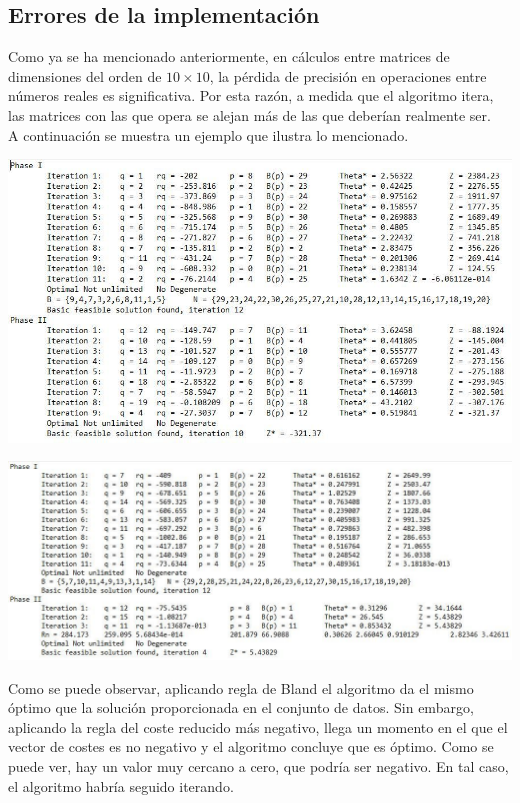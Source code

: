 \documentclass[12pt, titlepage]{article}
\begin{document}
\subsection{Errores de la implementación}
Como ya se ha mencionado anteriormente, en cálculos entre matrices de dimensiones del orden de $10 \times 10$, la pérdida de precisión en operaciones entre números reales es significativa. Por esta razón, a medida que el algoritmo itera, las matrices con las que opera se alejan más de las que deberían realmente ser. \\
A continuación se muestra un ejemplo que ilustra lo mencionado.\\
\begin{center}
\includegraphics[scale=0.5]{imagenes/output_1_RB.JPG}
\end{center}

\begin{center}
\includegraphics[scale=0.45]{imagenes/output_1_NRB.JPG}
\end{center}
Como se puede observar, aplicando regla de Bland el algoritmo da el mismo óptimo que la solución proporcionada en el conjunto de datos. Sin embargo, aplicando la regla del coste reducido más negativo, llega un momento en el que el vector de costes es no negativo y el algoritmo concluye que es óptimo. Como se puede ver, hay un valor muy cercano a cero, que podría ser negativo. En tal caso, el algoritmo habría seguido iterando.
\end{document}
